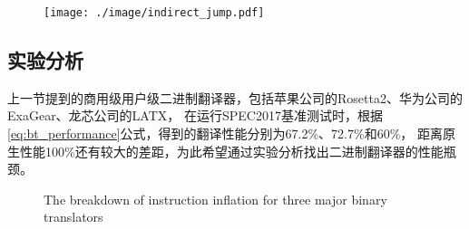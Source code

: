 \begin{figure}[!htbp]
  \centering
  \texttt{[image: ./image/indirect\_jump.pdf]}
  \label{img:indirect_jump}
\end{figure}

\subsection{实验分析}

上一节提到的商用级用户级二进制翻译器，包括苹果公司的Rosetta2、华为公司的ExaGear、龙芯公司的LATX，
在运行SPEC2017基准测试时，根据\ref{eq:bt_performance}公式，得到的翻译性能分别为67.2\%、72.7\%和60\%，
距离原生性能100\%还有较大的差距，为此希望通过实验分析找出二进制翻译器的性能瓶颈。


\begin{figure}[!htbp]
  \centering
      {\enspace The breakdown of instruction inflation for three major binary translators\cite{deflater}}
  \label{img:insts_inflt_breakdown_2017}
\end{figure}

